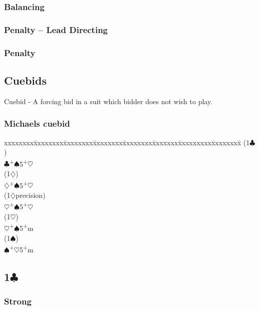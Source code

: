 \documentclass[10pt]{article}
\renewcommand{\c}{$\clubsuit$}
\renewcommand{\d}{$\diamondsuit$}
\newcommand{\h}{$\heartsuit$}
\newcommand{\s}{$\spadesuit$}
\newcommand{\p}{\textsuperscript{+}}
\newenvironment{bidtable}[1][]
{\textbf{#1}
  \begin{adjustwidth}{1em}{}
    \addvspace{2pt}
    \begin{tabbing}
      xxxxxxxx\=xxxxxxxx\=xxxxxxxx\=xxxxxxxx\=xxxxxxxx\=xxxxxxx\=xxxxxxxxx\=xxxxxxxx\=\kill}
{\end{tabbing}\end{adjustwidth}\bigskip}%
\newcommand{\pdfc}{\texorpdfstring{\c{}}{C}}
\begin{document}
\subsubsection{Balancing}

\subsubsection{Penalty -- Lead Directing}

\subsubsection{Penalty}




\subsection{Cuebids}
Cuebid - A forcing bid in a suit which bidder does not wish to play.

\subsubsection{Michaels cuebid}

\begin{bidtable}
(1\c)           \>                    \\
                \c {}\p\s 5\p\h \\
(1\d)           \>                    \\
                \d {}\p\s 5\p\h \\
(1\d precision) \>                    \\
                \h {}\p\s 5\p\h \\
(1\h)           \>                    \\
                \h {}\p\s 5\p m \\
(1\s)           \>                    \\
                \s {}\p\h 5\p m \\
\end{bidtable}
\subsection{1\pdfc}

\subsubsection{Strong}
\end{document}
